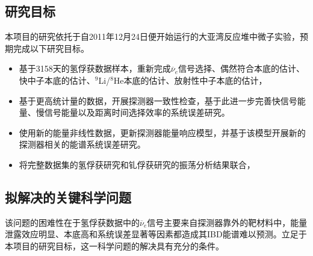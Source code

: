 \documentclass[a4paper,zihao=-4]{article}
\begin{document}
\subsection{研究目标}
本项目的研究依托于自2011年12月24日便开始运行的大亚湾反应堆中微子实验，预期完成以下研究目标。
\begin{itemize}
	\item {} 基于3158天的氢俘获数据样本，重新完成$\overline{\nu}_e$信号选择、偶然符合本底的估计、快中子本底的估计、$^9$Li/$^8$He本底的估计、放射性中子本底的估计，
	\item {}基于更高统计量的数据，开展探测器一致性检查，基于此进一步完善快信号能量、慢信号能量以及距离时间选择效率的系统误差研究。
	\item {}使用新的能量非线性数据，更新探测器能量响应模型，并基于该模型开展新的探测器相关的能谱系统误差研究。
	\item {}将完整数据集的氢俘获研究和钆俘获研究的振荡分析结果联合，
\end{itemize}

\subsection{拟解决的关键科学问题}

该问题的困难性在于氢俘获数据中的$\overline{\nu}_e$信号主要来自探测器靠外的靶材料中，能量泄露效应明显、本底高和系统误差显著等因素都造成其IBD能谱难以预测。立足于本项目的研究目标，这一科学问题的解决具有充分的条件。


\end{document}
